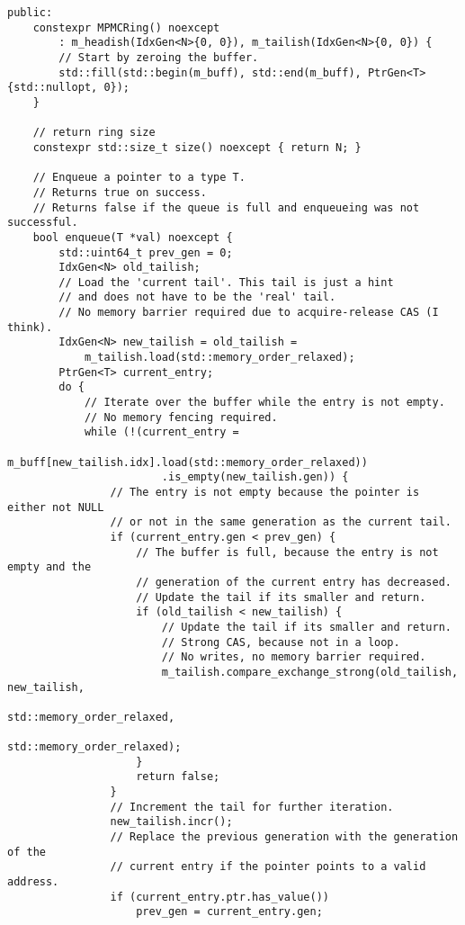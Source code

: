 \begin{lstlisting}[caption={Van Eerd's "An Interesting Lock-free Queue"},label=append_mpmc]
public:
    constexpr MPMCRing() noexcept
        : m_headish(IdxGen<N>{0, 0}), m_tailish(IdxGen<N>{0, 0}) {
        // Start by zeroing the buffer.
        std::fill(std::begin(m_buff), std::end(m_buff), PtrGen<T>{std::nullopt, 0});
    }

    // return ring size
    constexpr std::size_t size() noexcept { return N; }

    // Enqueue a pointer to a type T.
    // Returns true on success.
    // Returns false if the queue is full and enqueueing was not successful.
    bool enqueue(T *val) noexcept {
        std::uint64_t prev_gen = 0;
        IdxGen<N> old_tailish;
        // Load the 'current tail'. This tail is just a hint
        // and does not have to be the 'real' tail.
        // No memory barrier required due to acquire-release CAS (I think).
        IdxGen<N> new_tailish = old_tailish =
            m_tailish.load(std::memory_order_relaxed);
        PtrGen<T> current_entry;
        do {
            // Iterate over the buffer while the entry is not empty.
            // No memory fencing required.
            while (!(current_entry =
                        m_buff[new_tailish.idx].load(std::memory_order_relaxed))
                        .is_empty(new_tailish.gen)) {
                // The entry is not empty because the pointer is either not NULL
                // or not in the same generation as the current tail.
                if (current_entry.gen < prev_gen) {
                    // The buffer is full, because the entry is not empty and the
                    // generation of the current entry has decreased.
                    // Update the tail if its smaller and return.
                    if (old_tailish < new_tailish) {
                        // Update the tail if its smaller and return.
                        // Strong CAS, because not in a loop.
                        // No writes, no memory barrier required.
                        m_tailish.compare_exchange_strong(old_tailish, new_tailish,
                                                            std::memory_order_relaxed,
                                                            std::memory_order_relaxed);
                    }
                    return false;
                }
                // Increment the tail for further iteration.
                new_tailish.incr();
                // Replace the previous generation with the generation of the
                // current entry if the pointer points to a valid address.
                if (current_entry.ptr.has_value())
                    prev_gen = current_entry.gen;

\end{lstlisting}

